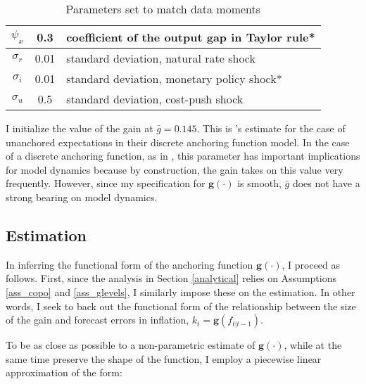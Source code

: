 \documentclass[11pt]{article}
\renewcommand{\[}{\begin{equation}}
\renewcommand{\]}{\end{equation}}
\def\meanalph{(0.82;    0.61;    0;    0.33;    0.45)}
\begin{document}
\begin{center}
\begin{table}
\begin{tabular}{ c | c  | l }
\hline
    $\psi_x$ & 0.3   & coefficient of the output gap in Taylor rule*  \\\hline %
    $\sigma_r$ & 0.01 & standard deviation, natural rate shock  \\ \hline
    $\sigma_i$ &  0.01  &standard deviation, monetary policy shock*  \\ \hline
    $\sigma_u$ & 0.5 & standard deviation, cost-push shock   \\ \hline  
\end{tabular}     
      \caption{Parameters set to match data moments}  \label{calibration_moments}
 \end{table}
\end{center}

\vspace{-2.2cm}

I initialize the value of the gain at $\bar{g}=0.145$. This is \cite{carvalho2019anchored}'s estimate for the case of unanchored expectations in their discrete anchoring function model. In the case of a discrete anchoring function, as in \cite{carvalho2019anchored}, this parameter has important implications for model dynamics because by construction, the gain takes on this value very frequently. However, since my specification for $\mathbf{g}(\cdot)$ is smooth, $\bar{g}$ does not have a strong bearing on model dynamics. 

\subsection{Estimation}

In inferring the functional form of the anchoring function $\mathbf{g}(\cdot)$, I proceed as follows. First, since the analysis in Section \ref{analytical} relies on Assumptions  \ref{ass_copo} and \ref{ass_glevels}, I similarly impose these on the estimation. In other words, I seek to back out the functional form of the relationship between the size of the gain and forecast errors in inflation, $k_t = \mathbf{g}(f_{t|t-1})$. 

To be as close as possible to a non-parametric estimate of $\mathbf{g}(\cdot)$, while at the same time preserve the shape of the function, I employ a piecewise linear approximation of the form:
\end{document}
